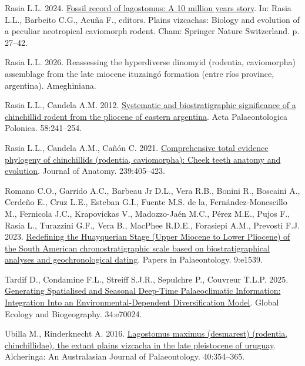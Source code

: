 \documentclass[
  9pt,
  letterpaper,
]{article}
\newlength{\cslhangindent}
\newenvironment{CSLReferences}[2] %
 {\begin{list}{}{%
  \setlength{\itemindent}{0pt}
  \setlength{\leftmargin}{0pt}
  \setlength{\parsep}{0pt}
  \ifodd #1
   \setlength{\leftmargin}{\cslhangindent}
   \setlength{\itemindent}{-1\cslhangindent}
  \fi
  \setlength{\itemsep}{#2\baselineskip}}}
 {\end{list}}
\begin{document}
\begin{CSLReferences}{1}{1}
Rasia L.L. 2024.
\href{https://doi.org/10.1007/978-3-031-49487-1_3}{Fossil record of
lagostomus: A 10 million years story}. In: Rasia L.L., Barbeito C.G.,
Acuña F., editors. Plains vizcachas: Biology and evolution of a peculiar
neotropical caviomorph rodent. Cham: Springer Nature Switzerland. p.
27--42.

Rasia L.L. 2026. Reassessing the hyperdiverse dinomyid (rodentia,
caviomorpha) assemblage from the late miocene ituzaingó formation (entre
ríos province, argentina). Ameghiniana.

Rasia L.L., Candela A.M. 2012.
\href{https://doi.org/10.4202/app.2011.0041}{Systematic and
biostratigraphic significance of a chinchillid rodent from the pliocene
of eastern argentina}. Acta Palaeontologica Polonica. 58:241--254.

Rasia L.L., Candela A.M., Cañón C. 2021.
\href{https://doi.org/10.1111/joa.13430}{Comprehensive total evidence
phylogeny of chinchillids (rodentia, caviomorpha): Cheek teeth anatomy
and evolution}. Journal of Anatomy. 239:405--423.

Romano C.O., Garrido A.C., Barbeau Jr D.L., Vera R.B., Bonini R.,
Boscaini A., Cerdeño E., Cruz L.E., Esteban G.I., Fuente M.S. de la,
Fernández-Monescillo M., Fernicola J.C., Krapovickas V., Madozzo-Jaén
M.C., Pérez M.E., Pujos F., Rasia L., Turazzini G.F., Vera B., MacPhee
R.D.E., Forasiepi A.M., Prevosti F.J. 2023.
\href{https://doi.org/10.1002/spp2.1539}{Redefining the Huayquerian
Stage (Upper Miocene to Lower Pliocene) of the South American
chronostratigraphic scale based on biostratigraphical analyses and
geochronological dating}. Papers in Palaeontology. 9:e1539.

Tardif D., Condamine F.L., Streiff S.J.R., Sepulchre P., Couvreur T.L.P.
2025. \href{https://doi.org/10.1111/geb.70024}{Generating Spatialised
and Seasonal Deep-Time Palaeoclimatic Information: Integration Into an
Environmental-Dependent Diversification Model}. Global Ecology and
Biogeography. 34:e70024.

Ubilla M., Rinderknecht A. 2016.
\href{https://doi.org/10.1080/03115518.2016.1145466}{Lagostomus maximus
(desmarest) (rodentia, chinchillidae), the extant plains vizcacha in the
late pleistocene of uruguay}. Alcheringa: An Australasian Journal of
Palaeontology. 40:354--365.


\end{CSLReferences}
\end{document}
